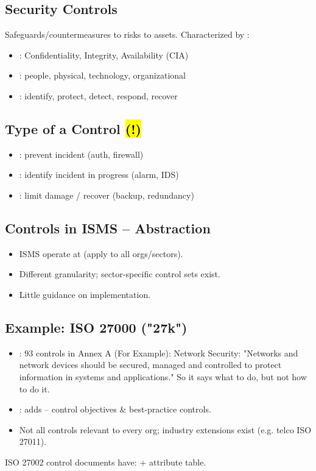 \subsection{Security Controls}
Safeguards/countermeasures to  risks to assets.
Characterized by :
\begin{itemize}
\item {}: Confidentiality, Integrity, Availability (CIA)
\item {}: people, physical, technology, organizational
\item {}: identify, protect, detect, respond, recover
\end{itemize}

\subsection{Type of a Control \hl{(!)}}
\begin{itemize}
\item {}: prevent incident (auth, firewall)
\item {}: identify incident in progress (alarm, IDS)
\item {}: limit damage / recover (backup, redundancy)
\end{itemize}

\subsection{Controls in ISMS -- Abstraction}
\begin{itemize}
\item ISMS operate at  (apply to all orgs/sectors).
\item Different granularity; sector-specific control sets exist.
\item Little guidance on  implementation.
\end{itemize}

\subsection{Example: ISO 27000 ("27k")}
\begin{itemize}
\item {}: 93 controls in Annex A (For Example): Network Security: "Networks and network devices should be secured, managed and controlled to protect information in systems and applications." So it says what to do, but not how to do it.
\item {}: adds  -- control objectives \& best-practice controls.
\item Not all controls relevant to every org; industry extensions exist (e.g. telco ISO 27011).
\end{itemize}
ISO 27002 control documents have:  + attribute table.

